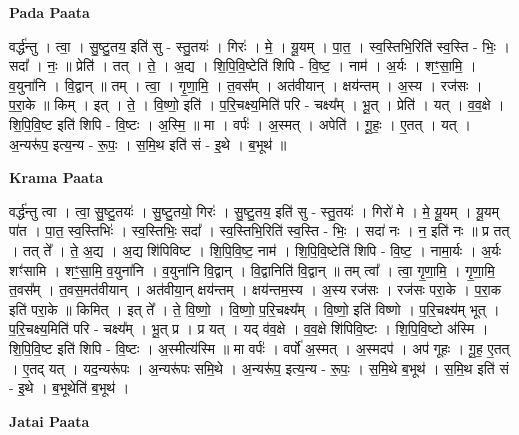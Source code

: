 \documentclass[17pt]{extarticle}
\begin{document}
\textbf{Pada Paata} \newline

वर्द्ध॑न्तु । त्वा॒ । सु॒ष्टु॒तय॒ इति॑ सु - स्तु॒तयः॑ । गिरः॑ । मे॒ । यू॒यम् । पा॒त॒ । स्व॒स्तिभि॒रिति॑ स्व॒स्ति - भिः॒ । सदा᳚ । नः॒ ॥ प्रेति॑ । तत् । ते॒ । अ॒द्य । शि॒पि॒वि॒ष्टेति॑ शिपि - वि॒ष्ट॒ । नाम॑ । अ॒र्यः । शꣳ॒॒सा॒मि॒ । व॒युना॑नि । वि॒द्वान् ॥ तम् । त्वा॒ । गृ॒णा॒मि॒ । त॒वस᳚म् । अत॑वीयान् । क्षय॑न्तम् । अ॒स्य । रज॑सः । प॒रा॒के ॥ किम् । इत् । ते॒ । वि॒ष्णो॒ इति॑ । प॒रि॒चक्ष्य॒मिति॑ परि - चक्ष्य᳚म् । भू॒त् । प्रेति॑ । यत् । व॒व॒क्षे । शि॒पि॒वि॒ष्ट इति॑ शिपि - वि॒ष्टः । अ॒स्मि॒ ॥ मा । वर्पः॑ । अ॒स्मत् । अपेति॑ । गू॒हः॒ । ए॒तत् । यत् । अ॒न्यरू॑प॒ इत्य॒न्य - रू॒पः॒ । स॒मि॒थ इति॑ सं - इ॒थे । ब॒भूथ॑ ॥  \newline


\textbf{Krama Paata} \newline

वर्द्ध॑न्तु त्वा । त्वा॒ सु॒ष्टु॒तयः॑ । सु॒ष्टु॒तयो॒ गिरः॑ । सु॒ष्टु॒तय॒ इति॑ सु - स्तु॒तयः॑ । गिरो॑ मे । मे॒ यू॒यम् । यू॒यम् पा॑त । पा॒त॒ स्व॒स्तिभिः॑ । स्व॒स्तिभिः॒ सदा᳚ । स्व॒स्तिभि॒रिति॑ स्व॒स्ति - भिः॒ । सदा॑ नः । न॒ इति॑ नः ॥ प्र तत् । तत् ते᳚ । ते॒ अ॒द्य । अ॒द्य शि॑पिविष्ट । शि॒पि॒वि॒ष्ट॒ नाम॑ । शि॒पि॒वि॒ष्टेति॑ शिपि - वि॒ष्ट॒ । नामा॒र्यः । अ॒र्यः शꣳ॑सामि । शꣳ॒॒सा॒मि॒ व॒युना॑नि । व॒युना॑नि वि॒द्वान् । वि॒द्वानिति॑ वि॒द्वान् ॥ तम् त्वा᳚ । त्वा॒ गृ॒णा॒मि॒ । गृ॒णा॒मि॒ त॒वस᳚म् । त॒वस॒मत॑वीयान् । अत॑वीया॒न् क्षय॑न्तम् । क्षय॑न्तम॒स्य । अ॒स्य रज॑सः । रज॑सः परा॒के । प॒रा॒क इति॑ परा॒के ॥ किमित् । इत् ते᳚ । ते॒ वि॒ष्णो॒ । वि॒ष्णो॒ प॒रि॒चक्ष्य᳚म् । वि॒ष्णो॒ इति॑ विष्णो । प॒रि॒चक्ष्य॑म् भूत् । प॒रि॒चक्ष्य॒मिति॑ परि - चक्ष्य᳚म् । भू॒त् प्र । प्र यत् । 
यद् व॑व॒क्षे । व॒व॒क्षे शि॑पिवि॒ष्टः । शि॒पि॒वि॒ष्टो अ॑स्मि । शि॒पि॒वि॒ष्ट इति॑ शिपि - वि॒ष्टः । अ॒स्मीत्य॑स्मि ॥ मा वर्पः॑ । वर्पो॑ अ॒स्मत् । अ॒स्मदप॑ । अप॑ गूहः । गू॒ह॒ ए॒तत् । ए॒तद् यत् । यद॒न्यरू॑पः । अ॒न्यरू॑पः समि॒थे । अ॒न्यरू॑प॒ इत्य॒न्य - रू॒पः॒ । स॒मि॒थे ब॒भूथ॑ । स॒मि॒थ इति॑ सं - इ॒थे । ब॒भूथेति॑ ब॒भूथ॑ । \newline

\textbf{Jatai Paata} \newline
\end{document}
